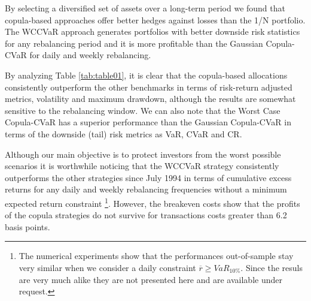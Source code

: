 \documentclass[a4paper,10pt]{article}
\begin{document}
By selecting a diversified set of assets over a long-term period we found that copula-based approaches offer better hedges against losses than the 1/N portfolio.
The WCCVaR approach generates portfolios with better downside risk statistics for any rebalancing period and it is more profitable than the Gaussian Copula-CVaR for daily and weekly rebalancing.

By analyzing Table \ref{tab:table01}, it is clear that
the copula-based allocations consistently outperform the other benchmarks in terms of risk-return adjusted metrics, volatility and maximum drawdown, although the results are somewhat sensitive to the rebalancing window.  We can also note that the Worst Case Copula-CVaR has a superior performance than the Gaussian Copula-CVaR in terms of the downside (tail) risk metrics as VaR, CVaR and CR. 

Although our main objective is to protect investors from the worst possible scenarios it is worthwhile noticing that the WCCVaR strategy
consistently outperforms the other strategies since July 1994 in terms of cumulative excess returns for
any daily and weekly rebalancing frequencies without a minimum expected return constraint \footnote{The numerical experiments show that the performances out-of-sample stay very similar when we consider a daily constraint $\overline{r}{\geq }VaR_{10\%}$. Since the resuls are very much alike they are not presented here and are available under request.}. However, the breakeven costs show that the profits of the copula strategies do not survive for transactions costs greater than 6.2 basis points.
\end{document}
